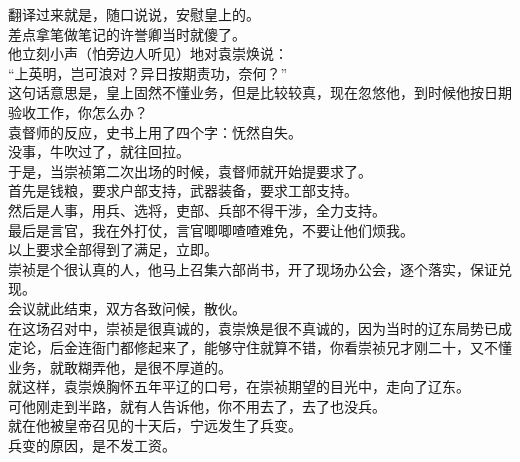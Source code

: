 \begin{multicols}{\theparacolNo}
翻译过来就是，随口说说，安慰皇上的。\\

差点拿笔做笔记的许誉卿当时就傻了。\\

他立刻小声（怕旁边人听见）地对袁崇焕说：\\

“上英明，岂可浪对？异日按期责功，奈何？”\\

这句话意思是，皇上固然不懂业务，但是比较较真，现在忽悠他，到时候他按日期验收工作，你怎么办？\\

袁督师的反应，史书上用了四个字：怃然自失。\\

没事，牛吹过了，就往回拉。\\

于是，当崇祯第二次出场的时候，袁督师就开始提要求了。\\

首先是钱粮，要求户部支持，武器装备，要求工部支持。\\

然后是人事，用兵、选将，吏部、兵部不得干涉，全力支持。\\

最后是言官，我在外打仗，言官唧唧喳喳难免，不要让他们烦我。\\

以上要求全部得到了满足，立即。\\

崇祯是个很认真的人，他马上召集六部尚书，开了现场办公会，逐个落实，保证兑现。\\

会议就此结束，双方各致问候，散伙。\\

在这场召对中，崇祯是很真诚的，袁崇焕是很不真诚的，因为当时的辽东局势已成定论，后金连衙门都修起来了，能够守住就算不错，你看崇祯兄才刚二十，又不懂业务，就敢糊弄他，是很不厚道的。\\

就这样，袁崇焕胸怀五年平辽的口号，在崇祯期望的目光中，走向了辽东。\\

可他刚走到半路，就有人告诉他，你不用去了，去了也没兵。\\

就在他被皇帝召见的十天后，宁远发生了兵变。\\

兵变的原因，是不发工资。\\


\end{multicols}
